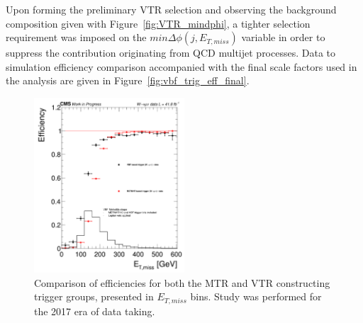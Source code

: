 \hspace{10pt} Upon forming the preliminary VTR selection and observing the background composition given with Figure~\ref{fig:VTR_mindphi}, a tighter selection requirement was imposed on the $min\Delta\phi(j, E_{T,miss})$ variable in order to suppress the contribution originating from QCD multijet processes. Data to simulation efficiency comparison accompanied with the final scale factors used in the analysis are given in Figure~\ref{fig:vbf_trig_eff_final}.

\begin{figure}[htbp]
  \centering
    \includegraphics[width=0.5\textwidth]{Analysis_strategy/VBF_eff/2017/VBF_vs_METMHT.png}
  \caption{Comparison of efficiencies for both the MTR and VTR constructing trigger groups, presented in $E_{T,miss}$ bins. Study was performed for the 2017 era of data taking.}
  \label{fig:vbf_metmht_comp}
\end{figure}

